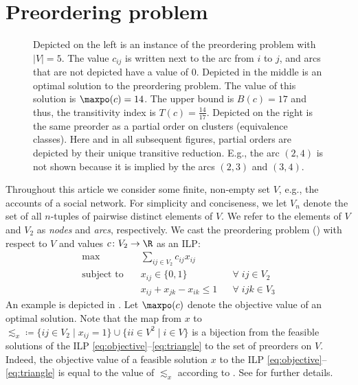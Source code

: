 \section{Preordering problem}
\label{sec:problem-statement}

\begin{figure}
    \centering
    \hspace{5ex}
    \hspace{5ex}
    
    \caption{Depicted on the left is an instance of the preordering problem with $\lvert V \rvert = 5$. 
    The value $c_{ij}$ is written next to the arc from $i$ to $j$, and arcs that are not depicted have a value of $0$.
    Depicted in the middle is an optimal solution to the preordering problem.
    The value of this solution is $\maxpo(c) = 14$.
    The upper bound is $B(c) = 17$ and thus, the transitivity index is $T(c) = \frac{14}{17}$.
    Depicted on the right is the same preorder as a partial order on clusters (equivalence classes).
    Here and in all subsequent figures, partial orders are depicted by their unique transitive reduction.
    E.g., the arc $(2, 4)$ is not shown because it is implied by the arcs $(2, 3)$ and $(3, 4)$.}
    \label{fig:example}
\end{figure}

Throughout this article we consider some finite, non-empty set $V$, e.g., the accounts of a social network.
For simplicity and conciseness, we let $V_n$ denote the set of all $n$-tuples of pairwise distinct elements of $V$.
We refer to the elements of $V$ and $V_2$ as \emph{nodes} and \emph{arcs}, respectively.
We cast the preordering problem () with respect to $V$ and values $c\colon V_{2}\to \R$ as an ILP:
%
\begin{align}
	\max \quad & \sum_{ij \in V_2} c_{ij} x_{ij} \label{eq:objective} \\
	\textrm{subject~to} \quad & x_{ij} \in \{0,1\} && \forall\; ij \in V_2 \label{eq:binary} \\
	& x_{ij} + x_{jk} - x_{ik} \leq 1 && \forall\; ijk \in V_3  \label{eq:triangle}
\end{align}
%
An example is depicted in .
Let $\maxpo(c)$ denote the objective value of an optimal solution.
Note that the map from $x$ to $\mathord{\lesssim_{x}} \coloneqq \{ ij \in V_{2} \mid x_{ij} = 1 \} \cup \{ ii \in V^{2} \mid i \in V \}$ is a bijection from the feasible solutions of the ILP \eqref{eq:objective}--\eqref{eq:triangle} to the set of preorders on $V$.
Indeed, the objective value of a feasible solution $x$ to the ILP \eqref{eq:objective}--\eqref{eq:triangle}  is equal to the value of $\lesssim_{x}$ according to .
See  for further details.

